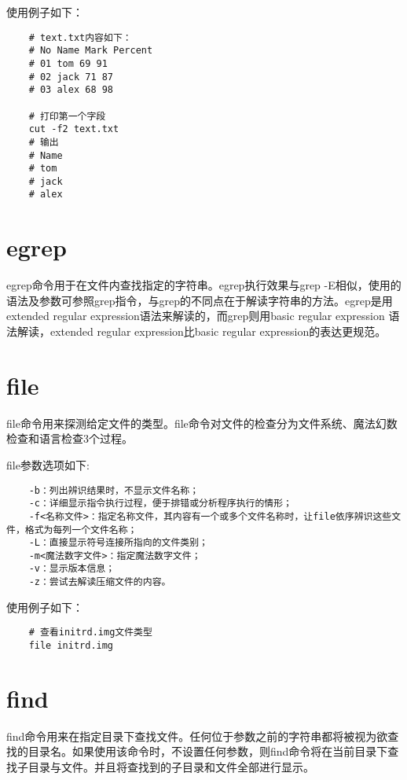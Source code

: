 \documentclass[a4paper,left=2.5cm,right=2.5cm,11pt]{article}
\begin{document}
	使用例子如下：
	\begin{lstlisting}
	# text.txt内容如下：
	# No Name Mark Percent 
	# 01 tom 69 91 
	# 02 jack 71 87 
	# 03 alex 68 98
	
	# 打印第一个字段
	cut -f2 text.txt
	# 输出
	# Name
	# tom
	# jack
	# alex
	\end{lstlisting}

\section{egrep}
	egrep命令用于在文件内查找指定的字符串。egrep执行效果与grep -E相似，使用的语法及参数可参照grep指令，与grep的不同点在于解读字符串的方法。egrep是用extended regular expression语法来解读的，而grep则用basic regular expression 语法解读，extended regular expression比basic regular expression的表达更规范。

\section{file}
	file命令用来探测给定文件的类型。file命令对文件的检查分为文件系统、魔法幻数检查和语言检查3个过程。\par

	file参数选项如下:
	\begin{lstlisting}
	-b：列出辨识结果时，不显示文件名称； 
	-c：详细显示指令执行过程，便于排错或分析程序执行的情形； 
	-f<名称文件>：指定名称文件，其内容有一个或多个文件名称时，让file依序辨识这些文件，格式为每列一个文件名称； 
	-L：直接显示符号连接所指向的文件类别； 
	-m<魔法数字文件>：指定魔法数字文件； 
	-v：显示版本信息； 
	-z：尝试去解读压缩文件的内容。
	\end{lstlisting}

	使用例子如下：
	\begin{lstlisting}
	# 查看initrd.img文件类型
	file initrd.img
	\end{lstlisting}

\section{find}
	find命令用来在指定目录下查找文件。任何位于参数之前的字符串都将被视为欲查找的目录名。如果使用该命令时，不设置任何参数，则find命令将在当前目录下查找子目录与文件。并且将查找到的子目录和文件全部进行显示。\par
\end{document}
